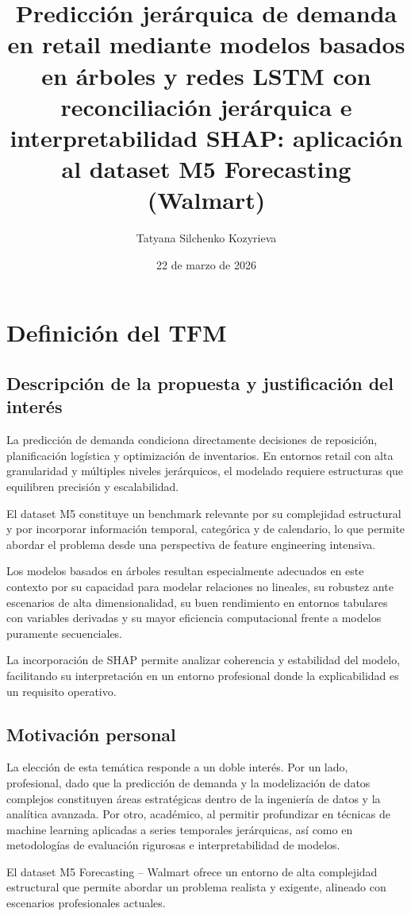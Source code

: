\documentclass[IB,BIB]{TFUOC}%
\title{Predicción jerárquica de demanda en retail mediante modelos basados en árboles y redes LSTM con reconciliación jerárquica e interpretabilidad SHAP: aplicación al dataset M5 Forecasting (Walmart)}
\author{Tatyana Silchenko Kozyrieva}
\date{22 de marzo de 2026}
\begin{document}
\estructura
\tableofcontents


\chapter{Definición del TFM}

\section{Descripción de la propuesta y justificación del interés}

La predicción de demanda condiciona directamente decisiones de
reposición, planificación logística y optimización de inventarios. En
entornos retail con alta granularidad y múltiples niveles jerárquicos,
el modelado requiere estructuras que equilibren precisión y
escalabilidad.

El dataset M5 constituye un benchmark relevante por su complejidad
estructural y por incorporar información temporal, categórica y de
calendario, lo que permite abordar el problema desde una perspectiva de
feature engineering intensiva.

Los modelos basados en árboles resultan especialmente adecuados en este
contexto por su capacidad para modelar relaciones no lineales, su
robustez ante escenarios de alta dimensionalidad, su buen rendimiento en
entornos tabulares con variables derivadas y su mayor eficiencia
computacional frente a modelos puramente secuenciales.

La incorporación de SHAP permite analizar coherencia y estabilidad del
modelo, facilitando su interpretación en un entorno profesional donde la
explicabilidad es un requisito operativo.

\section{Motivación personal}

La elección de esta temática responde a un doble interés. Por un lado,
profesional, dado que la predicción de demanda y la modelización de
datos complejos constituyen áreas estratégicas dentro de la ingeniería
de datos y la analítica avanzada. Por otro, académico, al permitir
profundizar en técnicas de machine learning aplicadas a series
temporales jerárquicas, así como en metodologías de evaluación rigurosas
e interpretabilidad de modelos.

El dataset M5 Forecasting -- Walmart ofrece un entorno de alta
complejidad estructural que permite abordar un problema realista y
exigente, alineado con escenarios profesionales actuales.
\end{document}
